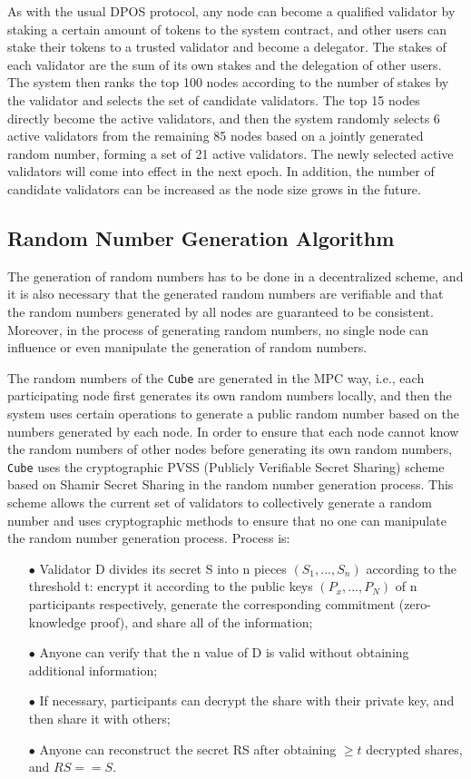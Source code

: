 \documentclass{iacrtrans}
\begin{document}
As with the usual DPOS protocol, any node can become a qualified validator by staking a certain amount of tokens to the system contract, and other users can stake their tokens to a trusted validator and become a delegator. The stakes of each validator are the sum of its own stakes and the delegation of other users.
The system then ranks the top 100 nodes according to the number of stakes by the validator and selects the set of candidate validators. The top 15 nodes directly become the active validators, and then the system randomly selects 6 active validators from the remaining 85 nodes based on a jointly generated random number, forming a set of 21 active validators. The newly selected active validators will come into effect in the next epoch. In addition, the number of candidate validators can be increased as the node size grows in the future.


\subsection{Random Number Generation Algorithm}
The generation of random numbers has to be done in a decentralized scheme, and it is also necessary that the generated random numbers are verifiable and that the random numbers generated by all nodes are guaranteed to be consistent. Moreover, in the process of generating random numbers, no single node can influence or even manipulate the generation of random numbers.

The random numbers of the \texttt{Cube} are generated in the MPC way, i.e., each participating node first generates its own random numbers locally, and then the system uses certain operations to generate a public random number based on the numbers generated by each node. In order to ensure that each node cannot know the random numbers of other nodes before generating its own random numbers, \texttt{Cube} uses the cryptographic PVSS (Publicly Verifiable Secret Sharing) scheme based on Shamir Secret Sharing in the random number generation process. This scheme allows the current set of validators to collectively generate a random number and uses cryptographic methods to ensure that no one can manipulate the random number generation process. Process is:
\begin{enumerate}
	\item[$\bullet$] Validator D divides its secret S into n pieces $(S_1,..., S_n)$ according to the threshold t: encrypt it according to the public keys $(P_x,..., P_N)$ of n participants respectively, generate the corresponding commitment (zero-knowledge proof), and share all of the information;
	\item[$\bullet$] Anyone can verify that the n value of D is valid without obtaining additional information;
	\item[$\bullet$] If necessary, participants can decrypt the share with their private key, and then share it with others;
	\item[$\bullet$] Anyone can reconstruct the secret RS after obtaining $\ge t$ decrypted shares, and $RS == S$.
\end{enumerate}
\end{document}

